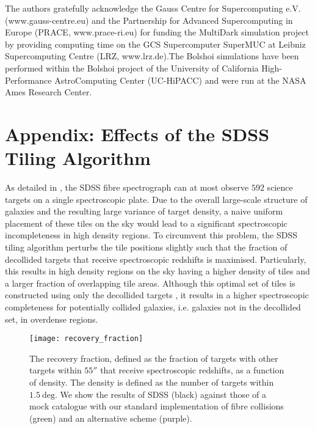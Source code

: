 \documentclass[fleqn,usenatbib,useAMS]{mnras}
\begin{document}
	The authors gratefully acknowledge the Gauss Centre for Supercomputing e.V. (www.gauss-centre.eu) and the Partnership for Advanced Supercomputing in Europe (PRACE, www.prace-ri.eu) for funding the MultiDark simulation project by providing computing time on the GCS Supercomputer SuperMUC at Leibniz Supercomputing Centre (LRZ, www.lrz.de).The Bolshoi simulations have been performed within the Bolshoi project of the University of California High-Performance AstroComputing Center (UC-HiPACC) and were run at the NASA Ames Research Center.
	
	\label{lastpage}
	
	
	
	
	\section*{Appendix: Effects of the SDSS Tiling Algorithm}
	\label{sec:Appendix}
	
	As detailed in \cite{Blanton+03a}, the SDSS fibre spectrograph can at most observe $592$ science targets on a single spectroscopic plate. Due to the overall large-scale structure of galaxies and the resulting large variance of target density, a naive uniform placement of these tiles on the sky would lead to a significant spectroscopic incompleteness in high density regions. To circumvent this problem, the SDSS tiling algorithm perturbs the tile positions slightly such that the fraction of decollided targets that receive spectroscopic redshifts is maximised. Particularly, this results in high density regions on the sky having a higher density of tiles and a larger fraction of overlapping tile areas. Although this optimal set of tiles is constructed using only the decollided targets \citep{Blanton+03a}, it results in a higher spectroscopic completeness for potentially collided galaxies, i.e. galaxies not in the decollided set, in overdense regions.
	
	\begin{figure}
		\centering
		\texttt{[image: recovery\_fraction]}
		\caption{The recovery fraction, defined as the fraction of targets with other targets within $55''$ that receive spectroscopic redshifts, as a function of density. The density is defined as the number of targets within $1.5 \ \mathrm{deg}$. We show the results of SDSS (black) against those of a mock catalogue with our standard implementation of fibre collisions (green) and an alternative scheme (purple).}
		\label{fig:recovery_fraction}
	\end{figure}
	
\end{document}
